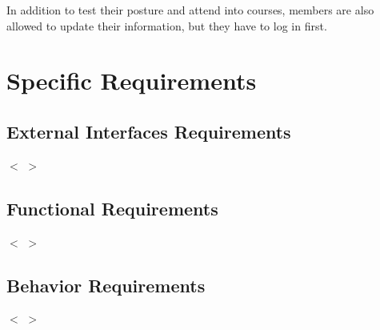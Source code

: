 \documentclass[16pt]{scrreprt}
\begin{document}
In addition to test their posture and attend into courses, members are also allowed to update their information, but they have to log in first.\\


\chapter{Specific Requirements}
\label{Specific Requirements}
\section{External Interfaces Requirements}
$<$ $>$

\section{Functional Requirements}
$<$ $>$

\section{Behavior Requirements}
$<$ $>$
\end{document}

